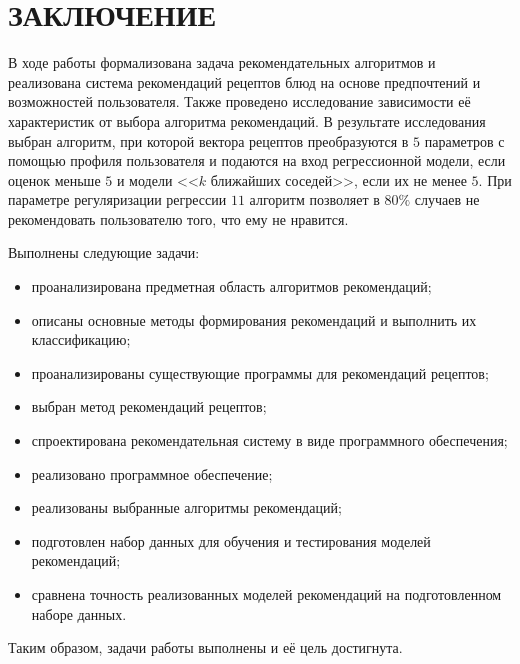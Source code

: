 \chapter*{ЗАКЛЮЧЕНИЕ}
В ходе работы формализована задача рекомендательных алгоритмов и реализована система рекомендаций рецептов блюд на основе предпочтений и возможностей пользователя.
Также проведено исследование зависимости её характеристик от выбора алгоритма рекомендаций.
В результате исследования выбран алгоритм, при которой вектора рецептов преобразуются в $5$ параметров с помощью профиля пользователя и подаются на вход регрессионной модели, если оценок меньше $5$ и модели <<$k$ ближайших соседей>>, если их не менее $5$.
При параметре регуляризации регрессии $11$ алгоритм позволяет в $80\%$ случаев не рекомендовать пользователю того, что ему не нравится.

Выполнены следующие задачи:
\begin{itemize}
    \item проанализирована предметная область алгоритмов рекомендаций;
    \item  описаны основные методы формирования рекомендаций и выполнить их классификацию;
    \item  проанализированы существующие программы для рекомендаций рецептов;
    \item  выбран метод рекомендаций рецептов;
    \item  спроектирована рекомендательная систему в виде программного обеспечения;
    \item  реализовано программное обеспечение;
    \item реализованы выбранные алгоритмы рекомендаций;
    \item  подготовлен набор данных для обучения и тестирования моделей рекомендаций;
    \item  сравнена точность реализованных моделей рекомендаций на подготовленном наборе данных.
\end{itemize}
Таким образом, задачи работы выполнены и её цель достигнута.